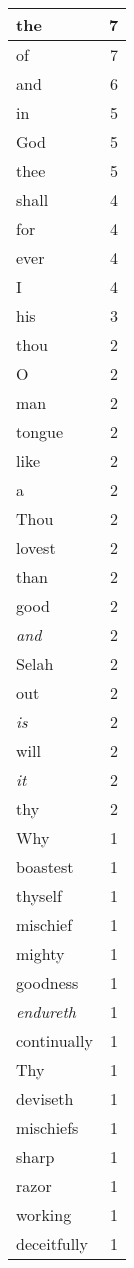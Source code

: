 \begin{center}
\begin{longtable}{l|r}
\hline \hline
\endlastfoot
the & 7 \\ \hline
of & 7 \\ \hline
and & 6 \\ \hline
in & 5 \\ \hline
God & 5 \\ \hline
thee & 5 \\ \hline
shall & 4 \\ \hline
for & 4 \\ \hline
ever & 4 \\ \hline
I & 4 \\ \hline
his & 3 \\ \hline
thou & 2 \\ \hline
O & 2 \\ \hline
man & 2 \\ \hline
tongue & 2 \\ \hline
like & 2 \\ \hline
a & 2 \\ \hline
Thou & 2 \\ \hline
lovest & 2 \\ \hline
than & 2 \\ \hline
good & 2 \\ \hline
\emph{and} & 2 \\ \hline
Selah & 2 \\ \hline
out & 2 \\ \hline
\emph{is} & 2 \\ \hline
will & 2 \\ \hline
\emph{it} & 2 \\ \hline
thy & 2 \\ \hline
Why & 1 \\ \hline
boastest & 1 \\ \hline
thyself & 1 \\ \hline
mischief & 1 \\ \hline
mighty & 1 \\ \hline
goodness & 1 \\ \hline
\emph{endureth} & 1 \\ \hline
continually & 1 \\ \hline
Thy & 1 \\ \hline
deviseth & 1 \\ \hline
mischiefs & 1 \\ \hline
sharp & 1 \\ \hline
razor & 1 \\ \hline
working & 1 \\ \hline
deceitfully & 1 \\ \hline

\end{longtable}
\end{center}
